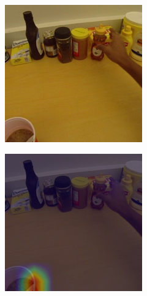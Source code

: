 \documentclass[10pt,twocolumn,hidelinks,letterpaper]{article}
\begin{document}
\begin{figure}[t]
  \centering
  \begin{subfigure}{.35\linewidth}
  	\includegraphics[width=\linewidth]{images/Cams1/S2_take_honey/rgb0004.png}
  \end{subfigure}
  \begin{subfigure}{.35\linewidth}
  	\includegraphics[width=\linewidth]{images/Cams1/S2_take_honey/rgb0004_CAM.png}

\end{subfigure}
\end{figure}
\end{document}
